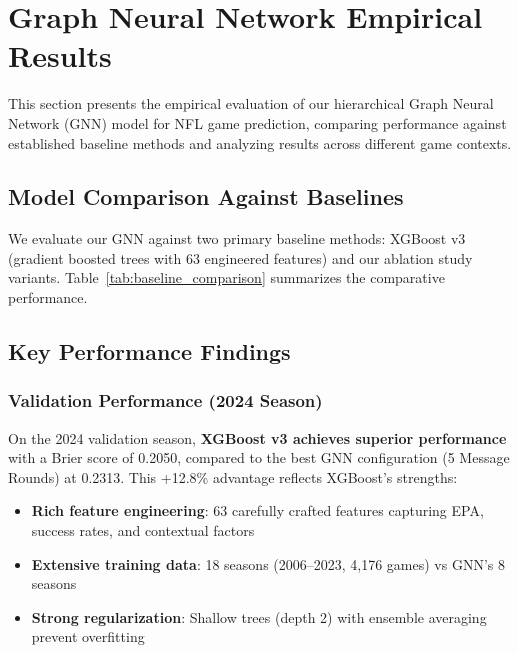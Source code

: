 \section{Graph Neural Network Empirical Results}
\label{sec:gnn_empirical_results}

This section presents the empirical evaluation of our hierarchical Graph Neural Network (GNN) model for NFL game prediction, comparing performance against established baseline methods and analyzing results across different game contexts.

\subsection{Model Comparison Against Baselines}
\label{subsec:gnn_baseline_comparison}

We evaluate our GNN against two primary baseline methods: XGBoost v3 (gradient boosted trees with 63 engineered features) and our ablation study variants. Table~\ref{tab:baseline_comparison} summarizes the comparative performance.



\subsection{Key Performance Findings}
\label{subsec:gnn_performance_findings}

\subsubsection{Validation Performance (2024 Season)}
\label{subsubsec:gnn_validation_performance}

On the 2024 validation season, \textbf{XGBoost v3 achieves superior performance} with a Brier score of 0.2050, compared to the best GNN configuration (5 Message Rounds) at 0.2313. This +12.8\% advantage reflects XGBoost's strengths:

\begin{itemize}[noitemsep]
    \item \textbf{Rich feature engineering}: 63 carefully crafted features capturing EPA, success rates, and contextual factors
    \item \textbf{Extensive training data}: 18 seasons (2006--2023, 4,176 games) vs GNN's 8 seasons
    \item \textbf{Strong regularization}: Shallow trees (depth 2) with ensemble averaging prevent overfitting
\end{itemize}

